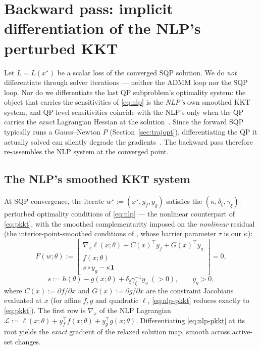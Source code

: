 \documentclass[10pt,twocolumn]{article}
\newcommand{\ones}{\mathbf{1}}
\begin{document}
\section{Backward pass: implicit differentiation of the NLP's perturbed KKT}
\label{sec:backward}

Let $L = L(x^\star)$ be a scalar loss of the converged SQP solution. We do
\emph{not} differentiate through solver iterations --- neither the ADMM loop nor the
SQP loop. Nor do we differentiate the last QP subproblem's optimality system: the
object that carries the sensitivities of \eqref{eq:nlp} is the \emph{NLP's} own
smoothed KKT system, and QP-level sensitivities coincide with the NLP's only when
the QP carries the \emph{exact} Lagrangian Hessian at the
solution~\cite[Thm.~2]{frey}. Since the forward SQP typically runs a Gauss--Newton
$P$ (Section~\ref{sec:trajopt}), differentiating the QP it actually solved can
silently degrade the gradients~\cite[Rem.~3]{frey}. The backward pass therefore
re-assembles the NLP system at the converged point.

\subsection{The NLP's smoothed KKT system}
At SQP convergence, the iterate $w^\star := (x^\star, y_f, y_g)$ satisfies the
$(\kappa,\delta_\xi,\gamma_\xi)$-perturbed optimality conditions of \eqref{eq:nlp}
--- the nonlinear counterpart of \eqref{eq:pkkt}, with the smoothed complementarity
imposed on the \emph{nonlinear} residual (the interior-point-smoothed conditions of
\cite[Eq.~(10)]{frey}, whose barrier parameter $\tau$ is our $\kappa$):
\begin{equation}
\label{eq:nlp-pkkt}
F(w;\theta) :=
\begin{bmatrix}
\nabla_x\ell(x;\theta) + C(x)^\top y_f + G(x)^\top y_g\\[1pt]
f(x;\theta)\\[1pt]
s \circ y_g - \kappa\ones
\end{bmatrix} = 0,
\end{equation}
\begin{equation}
\label{eq:nlp-sdef}
s := h(\theta) - g(x;\theta) + \delta_\xi\gamma_\xi^{-1}y_g \;(>0),
\qquad y_g > 0,
\end{equation}
where $C(x) := \partial f/\partial x$ and $G(x) := \partial g/\partial x$ are the
constraint Jacobians evaluated at $x$ (for affine $f,g$ and quadratic $\ell$,
\eqref{eq:nlp-pkkt} reduces exactly to \eqref{eq:pkkt}). The first row is
$\nabla_x$ of the NLP Lagrangian
$\mathcal L := \ell(x;\theta) + y_f^\top f(x;\theta) + y_g^\top g(x;\theta)$.
Differentiating \eqref{eq:nlp-pkkt} at its root yields the \emph{exact} gradient of
the relaxed solution map, smooth across active-set changes.
\end{document}
